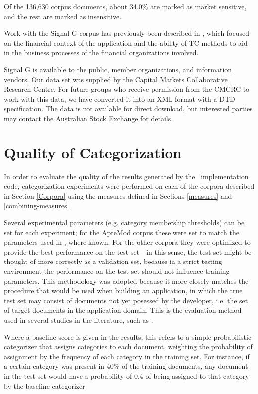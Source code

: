 Of the 136,630 corpus documents, about 34.0\% are marked as
market sensitive, and the rest are marked as insensitive.

Work with the Signal G corpus has previously been described in
\cite{calvo:02}, which focused on the financial context of the
application and the ability of TC methods to aid in the business
processes of the financial organizations involved.

Signal G is available to the public, member organizations, and
information vendors.  Our data set was supplied by the Capital Markets
Collaborative Research Centre.  For future groups who receive
permission from the CMCRC to work with this data, we have converted it
into an XML format with a DTD specification.  The data is not
available for direct download, but interested parties may contact the
Australian Stock Exchange for details.


\section{Quality of Categorization}
\label{Quality}

In order to evaluate the quality of the results generated by the
\aicat\ implementation code, categorization experiments were performed
on each of the corpora described in Section \ref{Corpora} using the
measures defined in Sections \ref{measures} and
\ref{combining-measures}.

Several
experimental parameters (e.g. category membership thresholds) can be
set for each experiment; for the ApteMod corpus these were set to
match the parameters used in \cite{yang:99}, where known.  For the
other corpora they were optimized to provide the
best performance on the test set---in this sense, the test set might
be thought of more correctly as a validation set, because in a strict
testing environment the performance on the test set should not
influence training parameters.  This methodology was adopted because
it more closely matches the procedure that would be used when building
an application, in which the true test set may consist of documents
not yet posessed by the developer, i.e. the set of target documents
in the application domain.  This is the evaluation method used in
several studies in the literature, such as \cite{joachims:98}.

Where a baseline score is given in the results, this refers to a
simple probabilistic categorizer that assigns categories to each
document, weighting the probability of assignment by the frequency of
each category in the training set.  For instance, if a certain
category was present in 40\% of the training documents, any document
in the test set would have a probability of 0.4 of being assigned to
that category by the baseline categorizer.  

